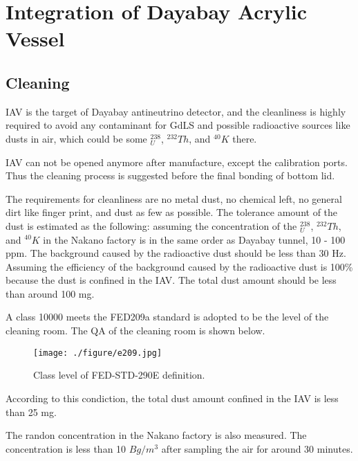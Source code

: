 
\section {Integration of Dayabay Acrylic Vessel}
\subsection {Cleaning}

IAV is the target of Dayabay antineutrino detector,
and the cleanliness is highly required to avoid any contaminant
for GdLS and possible radioactive sources like dusts in air, which
could be some $^{238}_U$, $^{232}Th$, and $^{40}K$ there.

IAV can not be opened anymore after manufacture, except the calibration ports.
Thus the cleaning process is suggested before the final bonding of bottom lid.


The requirements for cleanliness are no metal dust, no chemical left,
no general dirt like finger print, and dust as few as possible.
The tolerance amount of the dust is estimated as the following:
assuming the concentration of the $^238_U$, $^232Th$, and $^40K$
in the Nakano factory is in the same order as Dayabay tunnel, 10 - 100 ppm.
The background caused by the radioactive dust should be less than 30 Hz.
Assuming the efficiency of the background caused by the radioactive dust is 100\% because
the dust is confined in the IAV. The total dust amount should be less than around 100 mg.




A class 10000 meets the FED209a standard is adopted to be the level of the cleaning room.
The QA of the cleaning room is shown below.


\begin{figure}
    \centering
    \texttt{[image: ./figure/e209.jpg]}
    \caption{Class level of FED-STD-290E definition.}
    \label{e209.jpg}
    \end{figure}


According to this condiction, the total dust amount confined in the IAV is less
than 25 mg.


The randon concentration in the Nakano factory is also measured. The concentration
is less than 10 $Bg/m^3$ after sampling the air for around 30 minutes.


